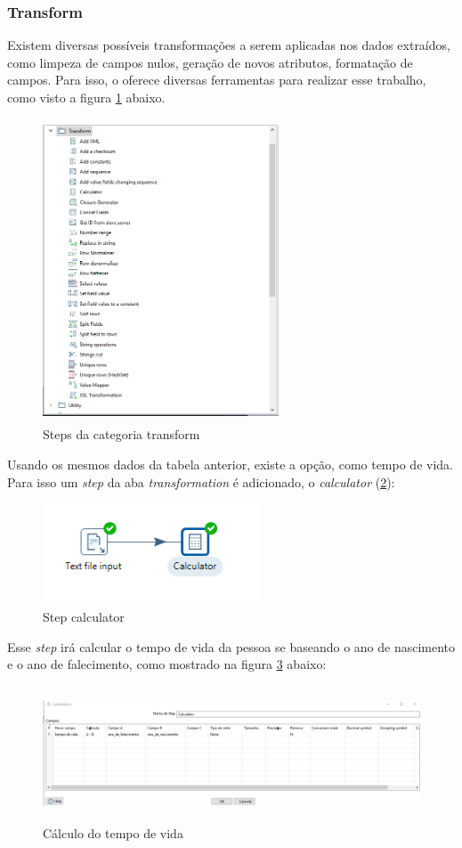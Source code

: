\subsubsection{Transform}
Existem diversas possíveis transformações a serem aplicadas nos dados extraídos, como limpeza de campos nulos, geração de novos atributos, formatação de campos. Para isso, o \pdi oferece diversas ferramentas para realizar esse trabalho, como visto a figura \ref{transformsteps} abaixo.
\begin{figure}[H]
\centering
\includegraphics[width=7cm, height=9cm]{imagens/transforms.png}
\caption{Steps da categoria transform}
\label{transformsteps}
\end{figure}
Usando os mesmos dados da tabela anterior, existe a opção, como tempo de vida. Para isso um \textit{step} da aba \textit{transformation} é adicionado, o \textit{calculator} (\ref{calculator}):
\begin{figure}[H]
\centering
\includegraphics[height=3cm]{imagens/calc.png}
\caption{Step calculator}
\label{calculator}
\end{figure}
Esse \textit{step} irá calcular o tempo de vida da pessoa se baseando o ano de nascimento e o ano de falecimento, como mostrado na figura \ref{timespan} abaixo:
\begin{figure}[H]
\centering
\includegraphics[height=4cm]{imagens/tempovida.png}
\caption{Cálculo do tempo de vida}
\label{timespan}
\end{figure}
